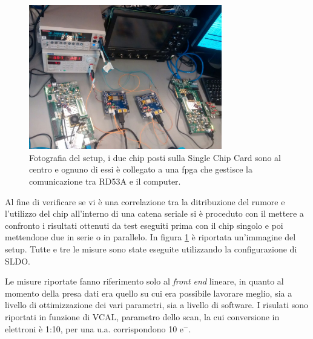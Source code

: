 \begin{figure}
\centering
\includegraphics[width=0.75\textwidth]{Immagini/chipserial}
\caption{Fotografia del setup, i due chip posti sulla Single Chip Card sono al centro e ognuno di essi è collegato a una fpga che gestisce la comunicazione tra RD53A e il computer.}
\label{chipserial}
\end{figure}
Al fine di verificare se vi è una correlazione tra la ditribuzione del rumore e l'utilizzo del chip all'interno di una catena seriale si è proceduto con il mettere a confronto i risultati ottenuti da test eseguiti prima con il chip singolo e poi mettendone due in serie o in parallelo. 
In figura \ref{chipserial} è riportata un'immagine del setup. 
Tutte e tre le misure sono state eseguite utilizzando la configurazione di SLDO.  

Le misure riportate fanno riferimento solo al \textit{front end} lineare, in quanto al momento della presa dati era quello su cui era possibile lavorare meglio, sia a livello di ottimizzazione dei vari parametri, sia a livello di software.
I risulati sono riportati in funzione di VCAL, parametro dello scan, la cui conversione in elettroni è 1:10, per una u.a. corrispondono 10 $\mathrm{e^{-}}$.

